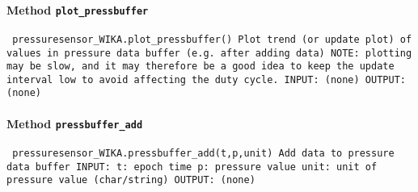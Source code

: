 \paragraph{Method \texttt{plot_pressbuffer}}
\vspace{1ex}
\texttt{\newline
pressuresensor_WIKA.plot_pressbuffer()\newline
\newline
Plot trend (or update plot) of values in pressure data buffer (e.g. after adding data)\newline
NOTE: plotting may be slow, and it may therefore be a good idea to keep the update interval low to avoid affecting the duty cycle.\newline
\newline
INPUT:\newline
(none)\newline
\newline
OUTPUT:\newline
(none)\newline
\newline
}

\paragraph{Method \texttt{pressbuffer_add}}
\vspace{1ex}
\texttt{\newline
pressuresensor_WIKA.pressbuffer_add(t,p,unit)\newline
\newline
Add data to pressure data buffer\newline
\newline
INPUT:\newline
t: epoch time\newline
p: pressure value\newline
unit: unit of pressure value (char/string)\newline
\newline
OUTPUT:\newline
(none)\newline
\newline
}

